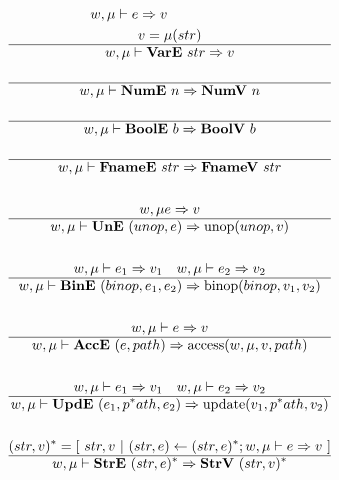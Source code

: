 
\begin{gather*}
  w, \mu \vdash e \Rightarrow v
%
\newline \\
  v = \mu(str) \\
  \hline
  w, \mu \vdash \vare ~ str \Rightarrow v \\
%
\newline \\
  \hline
  w, \mu \vdash \nume ~ n \Rightarrow \numv ~ n \\
%
\newline \\
  \hline
  w, \mu \vdash \boole ~ b \Rightarrow \boolv ~ b \\
%
\newline \\
  \hline
  w, \mu \vdash \fnamee ~ str \Rightarrow \fnamev ~ str \\
%
\newline \\
  w, \mu e \Rightarrow v \\
  \hline
  w, \mu \vdash \une ~ (unop, e) \Rightarrow \unop(unop, v) \\
%
\newline \\
  w, \mu \vdash e_1 \Rightarrow v_1 \quad w, \mu \vdash e_2 \Rightarrow v_2 \\
  \hline
  w, \mu \vdash \bine ~ (binop, e_1, e_2) \Rightarrow \binop(binop, v_1, v_2) \\
%
\newline \\
  w, \mu \vdash e \Rightarrow v \\
  \hline
  w, \mu \vdash \acce ~ (e, path) \Rightarrow \access(w, \mu, v, path) \\
%
\newline \\
  w, \mu \vdash e_1 \Rightarrow v_1 \quad w, \mu \vdash e_2 \Rightarrow v_2 \\
  \hline
  w, \mu \vdash \upde ~ (e_1, \seq path, e_2) \Rightarrow \update(v_1, \seq path, v_2) \\
%
\newline \\
  \seq{(str, v)} =
    [ ~
      str, v
    ~ | ~
      (str, e) \leftarrow \seq{(str, e)}; w, \mu \vdash e \Rightarrow v
    ~ ] \\
  \hline
  w, \mu \vdash \stre ~ \seq{(str, e)} \Rightarrow \strv ~ \seq{(str, v)} \\

\end{gather*}
